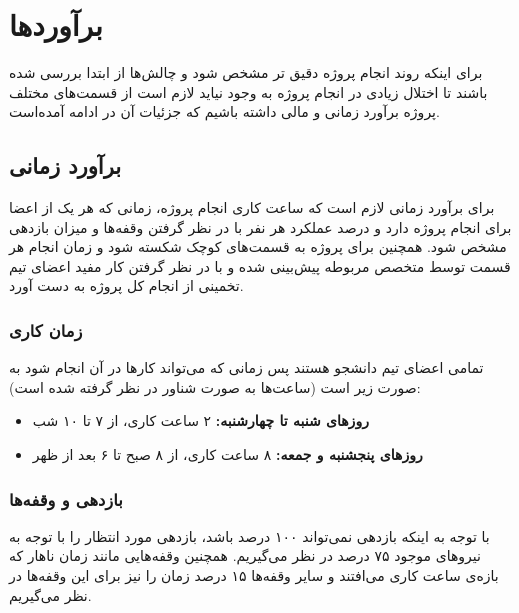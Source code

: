 \chapter{برآوردها}
برای اینکه روند انجام پروژه دقیق تر مشخص شود و چالش‌ها از ابتدا بررسی شده باشند تا اختلال زیادی در انجام پروژه به وجود نیاید لازم است از قسمت‌های مختلف پروژه برآورد زمانی و مالی داشته باشیم که جزئیات آن در ادامه آمده‌است.
\section{برآورد زمانی}
برای برآورد زمانی لازم است که ساعت کاری انجام پروژه، زمانی که هر یک از اعضا برای انجام پروژه دارد و درصد عملکرد هر نفر با در نظر گرفتن وقفه‌ها و میزان بازدهی مشخص شود. 
همچنین برای پروژه به قسمت‌های کوچک شکسته شود و زمان انجام هر قسمت توسط متخصص مربوطه پیش‌بینی شده و با در نظر گرفتن کار مفید اعضای تیم تخمینی از انجام کل پروژه به دست آورد. 

\subsection{زمان کاری}
تمامی اعضای تیم دانشجو هستند پس زمانی که می‌تواند کار‌ها در آن انجام شود به صورت زیر است (ساعت‌ها به صورت شناور در نظر گرفته شده است):

\begin{itemize}
	\item
	\textbf{روزهای شنبه تا چهارشنبه:}
	۲ ساعت کاری، از ۷ تا ۱۰ شب
	\item 
	\textbf{روزهای پنجشنبه و جمعه:}
	۸ ساعت کاری، از ۸ صبح تا ۶ بعد از ظهر 
\end{itemize}

\subsection{بازدهی و وقفه‌ها}
با توجه به اینکه بازدهی نمی‌تواند ۱۰۰ درصد باشد، بازدهی مورد انتظار را با توجه به نیرو‌های موجود ۷۵ درصد در نظر می‌گیریم. همچنین وقفه‌هایی مانند زمان ناهار که بازه‌ی ساعت کاری می‌افتند و سایر وقفه‌ها  ۱۵ درصد زمان را نیز برای این وقفه‌ها در نظر می‌گیریم.
